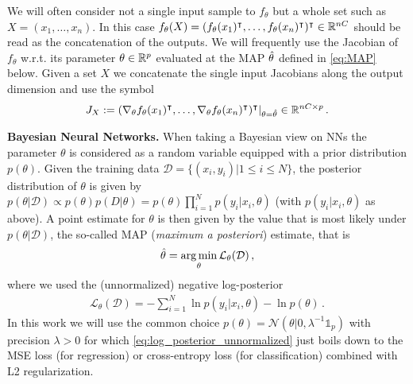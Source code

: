 We will often consider not a single input sample to $f_\theta$ but a whole set such as $X=(x_1,\ldots,x_n)$. In this case $f_\theta(X)=(f_\theta(x_1)^\intercal,\ldots,f_\theta(x_n)^\intercal)^\intercal\in \mathbb{R}^{nC}$ should be read as the concatenation of the outputs. We will frequently use the Jacobian of $f_\theta$ w.r.t. its parameter $\theta \in \mathbb{R}^p$ evaluated at the MAP $\hat{\theta}$ defined in \eqref{eq:MAP} below. Given a set $X$ we concatenate the single input Jacobians along the output dimension and use the symbol
\begin{equation}
    \label{eq:J_X}
    \begin{aligned}
        J_X := ( \nabla_\theta f_\theta(x_1)^\intercal,\ldots,  \nabla_\theta f_\theta(x_n)^\intercal)^\intercal\vert_{\theta=\hat{\theta}}\in \mathbb{R}^{nC\times p}\,.
    \end{aligned}
\end{equation}


\textbf{Bayesian Neural Networks.}
When taking a Bayesian view on NNs the parameter $\theta$ is considered as a random variable equipped with a prior distribution $p(\theta)$. Given the training data $\mathcal{D}=\{(x_i,y_i) | 1 \leq i \leq N\}$, the posterior distribution of $\theta$ is given by $p(\theta | \mathcal{D}) \propto p(\theta) p(D|\theta)= p(\theta)\prod_{i=1}^N p(y_i | x_i, \theta)$ (with $p(y_i|x_i, \theta)$ as above). A point estimate for $\theta$ is then given by the value that is most likely under $p(\theta|\mathcal{D})$, the so-called MAP (\emph{maximum a posteriori}) estimate, that is
\begin{align}
    \label{eq:MAP}
     \hat{\theta} = \operatorname*{arg\,min}_{\theta} \mathcal{L}_{\theta}(\mathcal{D})  \,,
\end{align} 
where we used the (unnormalized) negative log-posterior
\begin{align}
     \label{eq:log_posterior_unnormalized}
     \mathcal{L}_\theta(\mathcal{D}) = -\sum_{i=1}^N \ln p(y_i |x_i, \theta) - \ln p(\theta) \,.
\end{align}
In this work we will use the common choice $p(\theta) = \mathcal{N}(\theta|0,\lambda^{-1}\mathbb{1}_p)$ with precision $\lambda>0$ for which \eqref{eq:log_posterior_unnormalized} just boils down to the MSE loss (for regression) or cross-entropy loss (for classification) combined with L2 regularization.

